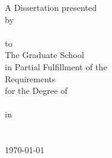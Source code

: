 \documentclass[
12pt, %
oneside, %
english, %
singlespacing, %
liststotoc, %
parskip, %
headsepline, %
]{main} %
\begin{document}
\begin{titlepage}
\begin{center}
\large A Dissertation presented \\[0.5cm] 
by \\[0.5cm] 
\href{http://k3yavi.github.io/}{\authorname} \\[0.5cm] 
to \\[0.5cm] 
The Graduate School \\[0.5cm] 
in Partial Fulfillment of the \\[0.5cm]
Requirements \\[0.5cm]
for the Degree of \\[0.5cm] 
\textbf{ \degreename}\\[0.5cm] %
in\\[0.5cm]
\deptname \\[1cm]
\univname\\[1cm] %
 
{\large \today}\\[4cm] %
 
\vfill
\end{center}
\end{titlepage}

\end{document}
